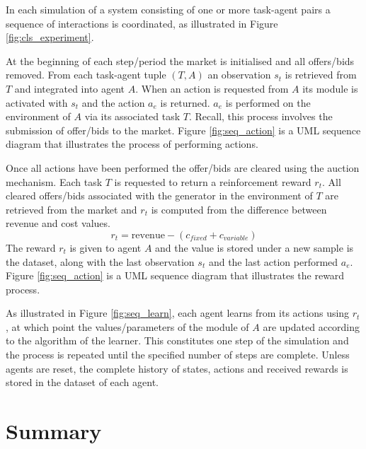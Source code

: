%

In each simulation of a system consisting of one or more task-agent pairs a
sequence of interactions is coordinated, as illustrated in Figure
\ref{fig:cls_experiment}.

%

At the beginning of each step/period the market is initialised and all
offers/bids removed.  From each task-agent tuple $(T,A)$ an observation $s_t$
is retrieved from $T$ and integrated into agent $A$.  When an action is
requested from $A$ its module is activated with $s_t$ and the action $a_e$ is
returned.  $a_e$ is performed on the environment of $A$ via its associated task
$T$.  Recall, this process involves the submission of offer/bids to the market.
Figure \ref{fig:seq_action} is a UML sequence diagram that illustrates the
process of performing actions.

%

Once all actions have been performed the offer/bids are cleared using the
auction mechanism.  Each task $T$ is requested to return a reinforcement reward
$r_t$. All cleared offers/bids associated with the generator in the environment
of $T$ are retrieved from the market and $r_t$ is computed from the difference
between revenue and cost values.
\begin{equation}
r_t = \mbox{revenue} - (c_{fixed} + c_{variable})
\end{equation}
The reward $r_t$ is given to agent $A$ and the value is stored under a new
sample is the dataset, along with the last observation $s_t$ and the last action
performed $a_e$.  Figure \ref{fig:seq_action} is a UML sequence diagram that
illustrates the reward process.

%

As illustrated in Figure \ref{fig:seq_learn}, each agent learns from its
actions using $r_t$, at which point the values/parameters of the module of $A$
are updated according to the algorithm of the learner. This constitutes one
step of the simulation and the process is repeated until the specified number
of steps are complete.  Unless agents are reset, the complete history of
states, actions and received rewards is stored in the dataset of each agent.

\section{Summary}
